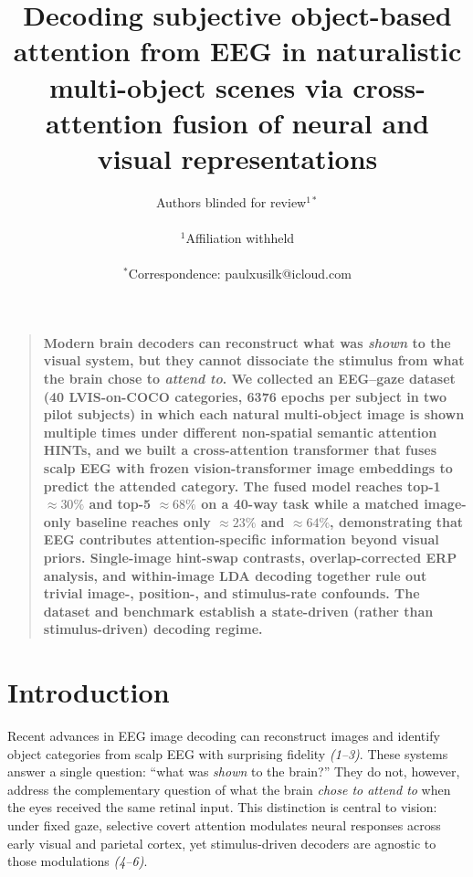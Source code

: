 \documentclass[12pt]{article}
\title{Decoding subjective object-based attention from EEG in
naturalistic multi-object scenes via cross-attention fusion of
neural and visual representations}
\author
{Authors blinded for review$^{1\ast}$\\
\\
\normalsize{$^{1}$Affiliation withheld}\\
\\
\normalsize{$^\ast$Correspondence: paulxusilk@icloud.com}
}
\date{}
\newenvironment{sciabstract}{\begin{quote} \bf}{\end{quote}}
\begin{document}
\baselineskip24pt
\maketitle

\begin{sciabstract}
Modern brain decoders can reconstruct what was \textit{shown} to the
visual system, but they cannot dissociate the stimulus from what the
brain chose to \textit{attend to}. We collected an EEG--gaze
dataset (40 LVIS-on-COCO categories, 6376 epochs per subject in two
pilot subjects) in which each natural multi-object image is shown
multiple times under different non-spatial semantic attention HINTs,
and we built a cross-attention transformer that fuses scalp EEG
with frozen vision-transformer image embeddings to predict the
attended category. The fused model reaches top-1
$\approx 30\%$ and top-5 $\approx 68\%$ on a 40-way task while a
matched image-only baseline reaches only $\approx 23\%$ and
$\approx 64\%$, demonstrating that EEG contributes attention-specific
information beyond visual priors. Single-image hint-swap contrasts,
overlap-corrected ERP analysis, and within-image LDA decoding
together rule out trivial image-, position-, and stimulus-rate
confounds. The dataset and benchmark establish a state-driven (rather
than stimulus-driven) decoding regime.
\end{sciabstract}

\section*{Introduction}

Recent advances in EEG image decoding can reconstruct images and
identify object categories from scalp EEG with surprising fidelity
\textit{(1--3)}. These systems answer a single question: ``what was
\textit{shown} to the brain?'' They do not, however, address the
complementary question of what the brain \textit{chose to attend to}
when the eyes received the same retinal input.  This distinction is
central to vision: under fixed gaze, selective covert attention
modulates neural responses across early visual and parietal cortex,
yet stimulus-driven decoders are agnostic to those modulations
\textit{(4--6)}.
\end{document}
